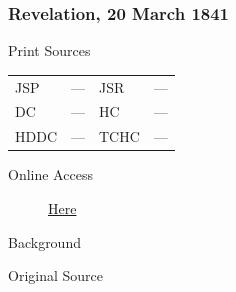 		\subsubsection{Revelation, 20 March 1841}
			\label{EMS-1841-JS-20-MAR-1841}
			
			\begin{description}
				\item[Print Sources]
			\end{description}

			\begin{tabular}{p{0.5in}p{1in}p{0.5in}p{1in}}
				JSP	 	& ---		& JSR 		& --- \\
				DC	 	& ---		& HC 		& --- \\
				HDDC 	& ---		& TCHC 		& --- \\
			\end{tabular}
			
			\begin{description}
				\item[Online Access] \href{https://www.josephsmithpapers.org/paper-summary/revelation-20march-1841/1}{Here}
			\end{description}
			
			\begin{description}
				\item[Background]
			\end{description}
			
			
			\begin{description}
				\item[Original Source]
			\end{description}
			
			
